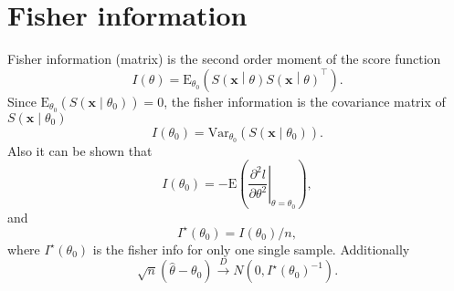\documentclass[a4paper,12pt]{article}
\begin{document}
\section{Fisher information}
\label{sec:fisher-information}

Fisher information (matrix) is the second order moment of the score function
\begin{equation}
  \label{eq:def_fisher_info}
  I\left(\theta\right) = \mathrm{E}_{\theta_0}\left(
    S\left(\bm{x}\middle|\theta\right)
    S\left(\bm{x}\middle|\theta\right)^\top
  \right)
  .
\end{equation}
Since $  \mathrm{E}_{\theta_0}\left(S\left(\bm{x}\middle|\theta_0\right)\right)= 0$, the fisher information is the covariance matrix of $S\left(\bm{x}\middle|\theta_0\right)$
\[
  I\left(\theta_0\right) = \mathrm{Var}_{\theta_0}\left(S\left(\bm{x}\middle|\theta_0\right)\right)
  .
\]
Also it can be shown that
\[
  I\left(\theta_0\right) =
  -\mathrm{E}\left(
    \left.\frac{\partial^2l}{\partial\theta^2}\right|_{\theta = \theta_0}
  \right)
  ,
\]
and
\[
  I^\star\left(\theta_0\right) = I\left(\theta_0\right) / n,
\]
where $I^{\star}\left(\theta_0\right)$ is the fisher info for only one single sample. Additionally
\[
  \sqrt{n}\left(
    \hat{\theta} - \theta_0
  \right)
  \overset{D}{\rightarrow}
  N\left(0, I^\star\left(\theta_0\right)^{-1}\right)
  .
\]



\end{document}
